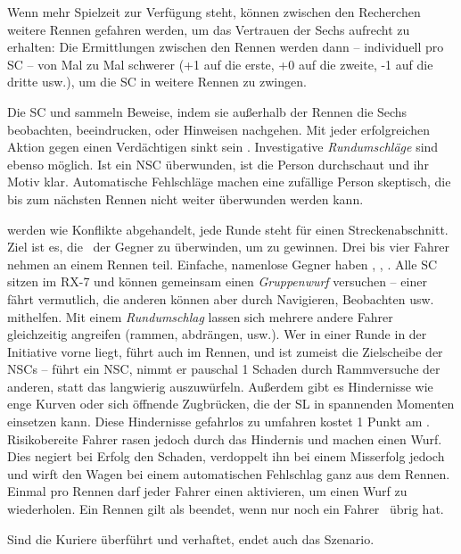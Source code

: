 {		 Wenn mehr Spielzeit zur Verfügung steht, können zwischen den Recherchen weitere Rennen gefahren werden, um das Vertrauen der Sechs aufrecht zu erhalten: Die Ermittlungen zwischen den Rennen werden dann -- individuell pro SC -- von Mal zu Mal schwerer (+1 auf die erste, +0 auf die zweite, -1 auf die dritte usw.), um die SC in weitere Rennen zu zwingen.


		\noindent
		Die SC  und sammeln Beweise, indem sie außerhalb der Rennen die Sechs beobachten, beeindrucken, oder Hinweisen nachgehen. Mit jeder erfolgreichen Aktion gegen einen Verdächtigen sinkt sein \HD. Investigative \emph{Rundumschläge} sind ebenso möglich. Ist ein NSC überwunden, ist die Person durchschaut und ihr Motiv klar. Automatische Fehlschläge machen eine zufällige Person skeptisch, die bis zum nächsten Rennen nicht weiter überwunden werden kann.

		 werden wie Konflikte abgehandelt, jede Runde steht für einen Streckenabschnitt. Ziel ist es, die \HD\ der Gegner zu überwinden, um zu gewinnen. Drei bis vier Fahrer nehmen an einem Rennen teil. Einfache, namenlose Gegner haben , , . Alle SC sitzen im RX-7 und können gemeinsam einen \emph{Gruppenwurf} versuchen -- einer fährt vermutlich, die anderen können aber durch Navigieren, Beobachten usw. mithelfen. Mit einem \emph{Rundumschlag} lassen sich mehrere andere Fahrer gleichzeitig angreifen (rammen, abdrängen, usw.). Wer in einer Runde in der Initiative vorne liegt, führt auch im Rennen, und ist zumeist die Zielscheibe der NSCs -- führt ein NSC, nimmt er pauschal 1 Schaden durch Rammversuche der anderen, statt das langwierig auszuwürfeln. Außerdem gibt es Hindernisse wie enge Kurven oder sich öffnende Zugbrücken, die der SL in spannenden Momenten einsetzen kann. Diese Hindernisse gefahrlos zu umfahren kostet 1 Punkt am \HD. Risikobereite Fahrer rasen jedoch durch das Hindernis und machen einen Wurf. Dies negiert bei Erfolg den Schaden, verdoppelt ihn bei einem Misserfolg jedoch und wirft den Wagen bei einem automatischen Fehlschlag ganz aus dem Rennen. Einmal pro Rennen darf jeder Fahrer einen  aktivieren, um einen Wurf zu wiederholen. Ein Rennen gilt als beendet, wenn nur noch ein Fahrer \HD\ übrig hat.


		\noindent
		Sind die Kuriere überführt und verhaftet, endet auch das Szenario.

}
